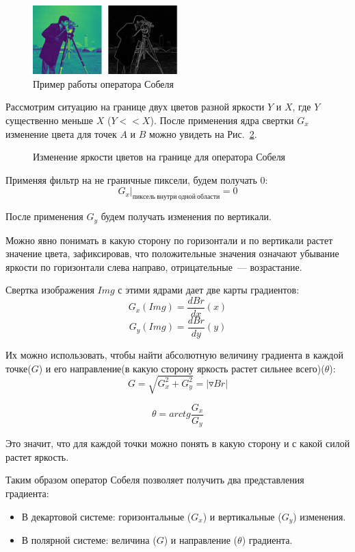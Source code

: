 \begin{figure}[h]
    \centering
    \includegraphics[width=0.5\textwidth]{sobel_example.png}
    \caption{Пример работы оператора Собеля}
    \label{fig:sobel_example}
\end{figure}

Рассмотрим ситуацию на границе двух цветов разной яркости $Y$ и $X$, где $Y$ существенно меньше $X$ ($Y<<X$). После применения ядра свертки $G_x$ изменение цвета для точек $A$ и $B$ можно увидеть на Рис.~\ref{fig:sobel_on_border}.

\begin{figure}[h]
    \centering
    
    \caption{Изменение яркости цветов на границе для оператора Собеля}
    \label{fig:sobel_on_border}
\end{figure}

Применяя фильтр на не граничные пиксели, будем получать 0:
\[
    G_x|_{пиксель \ внутри \  одной \ области}= 0
\]

После применения $G_y$ будем получать изменения по вертикали.

Можно явно понимать в какую сторону по горизонтали и по вертикали растет значение цвета, зафиксировав, что положительные значения означают убывание яркости по горизонтали слева направо, отрицательные~--- возрастание.

Свертка изображения $Img$ с этими ядрами дает две карты градиентов:
\[
    G_x(Img) = \frac{d Br}{dx} (x)
\]
\[
    G_y(Img) = \frac{d Br}{dy} (y)
\]

Их можно использовать, чтобы найти абсолютную величину градиента в каждой точке($G$) и его направление(в какую сторону яркость растет сильнее всего)($\theta$):
\[
    G = \sqrt{G_x^2 + G_y^2} = |\triangledown Br|
\]

\[
    \theta = arctg \frac{G_x}{G_y}
\]

Это значит, что для каждой точки можно понять в какую сторону и с какой силой растет яркость.

Таким образом оператор Собеля позволяет получить два представления градиента:
\begin{itemize}
    \item В декартовой системе: горизонтальные (\(G_x\)) и вертикальные (\(G_y\)) изменения.
    \item В полярной системе: величина (\(G\)) и направление (\(\theta\)) градиента.
\end{itemize}

